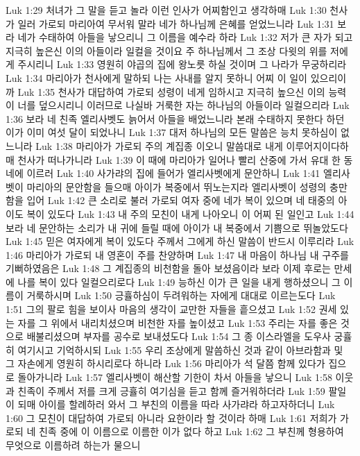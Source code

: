 Luk 1:29  처녀가 그 말을 듣고 놀라 이런 인사가 어찌함인고 생각하매
Luk 1:30  천사가 일러 가로되 마리아여 무서워 말라 네가 하나님께 은혜를 얻었느니라
Luk 1:31  보라 네가 수태하여 아들을 낳으리니 그 이름을 예수라 하라
Luk 1:32  저가 큰 자가 되고 지극히 높은신 이의 아들이라 일컬을 것이요 주 하나님께서 그 조상 다윗의 위를 저에게 주시리니
Luk 1:33  영원히 야곱의 집에 왕노릇 하실 것이며 그 나라가 무궁하리라
Luk 1:34  마리아가 천사에게 말하되 나는 사내를 알지 못하니 어찌 이 일이 있으리이까
Luk 1:35  천사가 대답하여 가로되 성령이 네게 임하시고 지극히 높으신 이의 능력이 너를 덮으시리니 이러므로 나실바 거룩한 자는 하나님의 아들이라 일컬으리라
Luk 1:36  보라 네 친족 엘리사벳도 늙어서 아들을 배었느니라 본래 수태하지 못한다 하던 이가 이미 여섯 달이 되었나니
Luk 1:37  대저 하나님의 모든 말씀은 능치 못하심이 없느니라
Luk 1:38  마리아가 가로되 주의 계집종 이오니 말씀대로 내게 이루어지이다하매 천사가 떠나가니라
Luk 1:39  이 때에 마리아가 일어나 빨리 산중에 가서 유대 한 동네에 이르러
Luk 1:40  사가랴의 집에 들어가 엘리사벳에게 문안하니
Luk 1:41  엘리사벳이 마리아의 문안함을 들으매 아이가 복중에서 뛰노는지라 엘리사벳이 성령의 충만함을 입어
Luk 1:42  큰 소리로 불러 가로되 여자 중에 네가 복이 있으며 네 태중의 아이도 복이 있도다
Luk 1:43  내 주의 모친이 내게 나아오니 이 어찌 된 일인고
Luk 1:44  보라 네 문안하는 소리가 내 귀에 들릴 때에 아이가 내 복중에서 기쁨으로 뛰놀았도다
Luk 1:45  믿은 여자에게 복이 있도다 주께서 그에게 하신 말씀이 반드시 이루리라
Luk 1:46  마리아가 가로되 내 영혼이 주를 찬양하며
Luk 1:47  내 마음이 하나님 내 구주를 기뻐하였음은
Luk 1:48  그 계집종의 비천함을 돌아 보셨음이라 보라 이제 후로는 만세에 나를 복이 있다 일컬으리로다
Luk 1:49  능하신 이가 큰 일을 내게 행하셨으니 그 이름이 거룩하시며
Luk 1:50  긍휼하심이 두려워하는 자에게 대대로 이르는도다
Luk 1:51  그의 팔로 힘을 보이사 마음의 생각이 교만한 자들을 흩으셨고
Luk 1:52  권세 있는 자를 그 위에서 내리치셨으며 비천한 자를 높이셨고
Luk 1:53  주리는 자를 좋은 것으로 배불리셨으며 부자를 공수로 보내셨도다
Luk 1:54  그 종 이스라엘을 도우사 궁휼히 여기시고 기억하시되
Luk 1:55  우리 조상에게 말씀하신 것과 같이 아브라함과 및 그 자손에게 영원히 하시리로다 하니라
Luk 1:56  마리아가 석 달쯤 함께 있다가 집으로 돌아가니라
Luk 1:57  엘리사벳이 해산할 기한이 차서 아들을 낳으니
Luk 1:58  이웃과 친족이 주께서 저를 크게 긍휼히 여기심을 듣고 함께 즐거워하더라
Luk 1:59  팔일이 되매 아이를 할례하러 와서 그 부친의 이름을 따라 사가랴라 하고자하더니
Luk 1:60  그 모친이 대답하여 가로되 아니라 요한이라 할 것이라 하매
Luk 1:61  저희가 가로되 네 친족 중에 이 이름으로 이름한 이가 없다 하고
Luk 1:62  그 부친께 형용하여 무엇으로 이름하려 하는가 물으니
